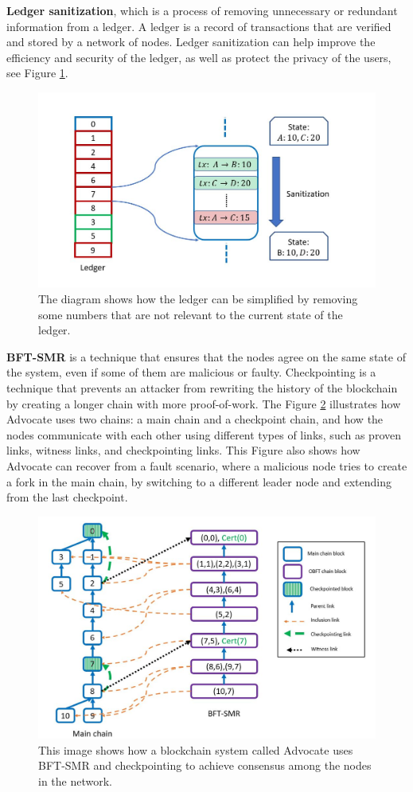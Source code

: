 \documentclass{report}
\begin{document}
\textbf{Ledger sanitization}, which is a process of removing unnecessary or redundant information from a ledger. A ledger is a record of transactions that are verified and stored by a network of nodes. Ledger sanitization can help improve the efficiency and security of the ledger, as well as protect the privacy of the users, see Figure \ref{fig:f7}.
\begin{figure}[h!]
	\centering
	\includegraphics[width=0.8\linewidth]{Fig/F7}
	\caption{The diagram shows how the ledger can be simplified by removing some numbers that are not relevant to the current state of the ledger.}
	\label{fig:f7}
\end{figure}
\textbf{BFT-SMR} is a technique that ensures that the nodes agree on the same state of the system, even if some of them are malicious or faulty. Checkpointing is a technique that prevents an attacker from rewriting the history of the blockchain by creating a longer chain with more proof-of-work. The Figure \ref{fig:f8} illustrates how Advocate uses two chains: a main chain and a checkpoint chain, and how the nodes communicate with each other using different types of links, such as proven links, witness links, and checkpointing links. This Figure also shows how Advocate can recover from a fault scenario, where a malicious node tries to create a fork in the main chain, by switching to a different leader node and extending from the last checkpoint.
\begin{figure}[h!]
	\centering
	\includegraphics[width=0.8\linewidth]{Fig/F8}
	\caption{This image shows how a blockchain system called Advocate uses BFT-SMR and checkpointing to achieve consensus among the nodes in the network.}
	\label{fig:f8}
\end{figure}
\end{document}
